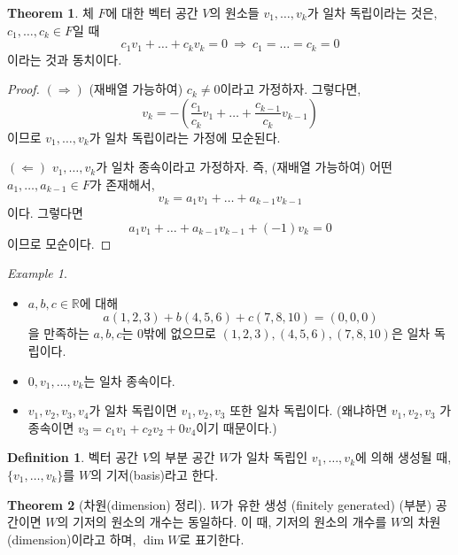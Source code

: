 \documentclass[unfonts,oneside,a4paper]{oblivoir}
\theoremstyle{definition}
\newtheorem{definition}{Definition}
\theoremstyle{theorem}
\newtheorem{theorem}{Theorem}
\theoremstyle{remark}
\theoremstyle{remark}
\theoremstyle{remark}
\newtheorem*{example}{Example}
\theoremstyle{remark}
\renewcommand{\vec}[1]{\bm{\mathit{#1}}}
\newcommand{\vecz}{\bm{\mathrm{0}}}
\begin{document}
\begin{theorem}
    체 $F$에 대한 벡터 공간 $V$의 원소들 $\vec v_1, \dots, \vec v_k$가 일차 독립이라는 것은, $c_1, \dots, c_k \in F$일 때
    \[
        c_1 \vec v_1 + \dots + c_k \vec v_k = \vecz\ \Rightarrow\ c_1 = \dots = c_k = 0
    \]
    이라는 것과 동치이다.
\end{theorem}

\begin{proof}
    $(\Rightarrow)$ (재배열 가능하여) $c_k \neq 0$이라고 가정하자.
    그렇다면,
    \[
        \vec v_k = - \left(\frac{c_1}{c_k} \vec v_1 + \dots + \frac{c_{k - 1}}{c_k} \vec v_{k - 1}\right)
    \]
    이므로 $\vec v_1, \dots, \vec v_k$가 일차 독립이라는 가정에 모순된다.

    $(\Leftarrow)$ $\vec v_1, \dots, \vec v_k$가 일차 종속이라고 가정하자.
    즉, (재배열 가능하여) 어떤 $a_1, \dots, a_{k - 1} \in F$가 존재해서,
    \[
        \vec v_k = a_1 \vec v_1 + \dots + a_{k - 1} \vec v_{k - 1}
    \]
    이다.
    그렇다면
    \[
        a_1 \vec v_1 + \dots + a_{k - 1} \vec v_{k - 1} + (-1) \vec v_k = \vecz
    \]
    이므로 모순이다.
\end{proof}

\begin{example}
    \leavevmode
    \begin{itemize}
        \item $a, b, c \in \mathbb R$에 대해
            \[
                a(1, 2, 3) + b(4, 5, 6) + c(7, 8, 10) = (0, 0, 0)
            \]
            을 만족하는 $a, b, c$는 0밖에 없으므로 $(1, 2, 3), (4, 5, 6), (7, 8, 10)$은 일차 독립이다.
        \item $\vecz, \vec v_1, \dots, \vec v_k$는 일차 종속이다.
        \item $\vec v_1, \vec v_2, \vec v_3, \vec v_4$가 일차 독립이면 $\vec v_1, \vec v_2, \vec v_3$ 또한 일차 독립이다.
            (왜냐하면 $\vec v_1, \vec v_2, \vec v_3$ 가 종속이면 $\vec v_3 = c_1 \vec v_1 + c_2 \vec v_2 + 0 \vec v_4$이기 때문이다.)
    \end{itemize}
\end{example}

\begin{definition}
    벡터 공간 $V$의 부분 공간 $W$가 일차 독립인 $\vec v_1, \dots, \vec v_k$에 의해 생성될 때, $\{ \vec v_1, \dots, \vec v_k\}$를 $W$의 기저(basis)라고 한다.
\end{definition}

\begin{theorem}[차원(dimension) 정리]
    $W$가 유한 생성 (finitely generated) (부분) 공간이면 $W$의 기저의 원소의 개수는 동일하다.
    이 때, 기저의 원소의 개수를 $W$의 차원(dimension)이라고 하며, $\dim W$로 표기한다.
\end{theorem}
\end{document}
